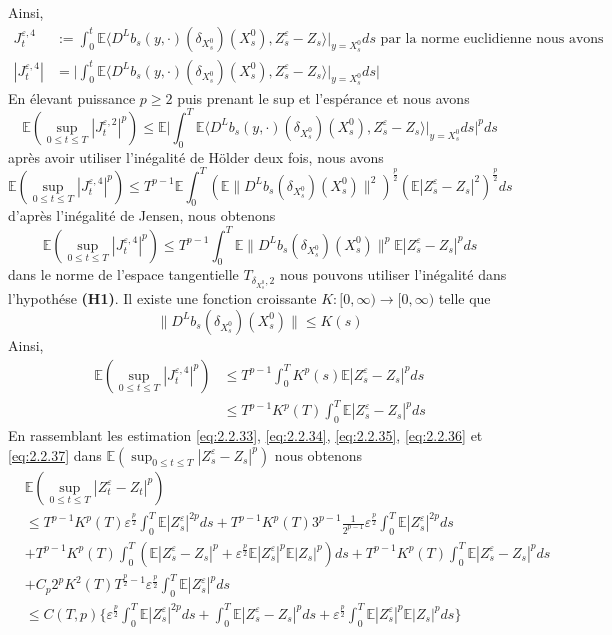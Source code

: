 \documentclass[12pt,a4paper,twoside,fleqn]{book}%
\theoremstyle{definition}
\theoremstyle{lemme}
\numberwithin{equation}{section}
\begin{document}
Ainsi,
\[\begin{aligned}
J_t^{\varepsilon,4}&:=\int_{0}^{t}\mathbb{E}\langle D^L b_s(y, \cdot)(\delta_{X_s^0})(X_s^0), Z_s^\varepsilon-Z_s\rangle|_{y=X_s^0}ds\text{ par la norme euclidienne nous avons}\\
|J_t^{\varepsilon,4}|&= \Big|\int_{0}^{t}\mathbb{E}\langle D^L b_s(y, \cdot)(\delta_{X_s^0})(X_s^0), Z_s^\varepsilon-Z_s\rangle|_{y=X_s^0}ds\Big|
\end{aligned}
\]
En élevant puissance $p\geq2$ puis prenant le sup et l'espérance et nous avons
\[
\mathbb{E}\left(\sup_{0\leq t \leq T}|J_t^{\varepsilon,2}|^p\right)\leq \mathbb{E}\Big|\int_{0}^{T}\mathbb{E}\langle D^L b_s(y, \cdot)(\delta_{X_s^0})(X_s^0), Z_s^\varepsilon-Z_s\rangle|_{y=X_s^0}ds\Big|^pds 
\]
après avoir utiliser l'inégalité de Hölder deux fois, nous avons
\[
\mathbb{E}\left(\sup_{0\leq t \leq T}|J_t^{\varepsilon,4}|^p\right)\leq T^{p-1}\mathbb{E}\int_{0}^{T}\left(\mathbb{E}\|D^Lb_s(\delta_{X_s^0})(X_s^0)\|^2\right)^{\frac{p}{2}}\left(\mathbb{E}|Z_s^\varepsilon-Z_s|^2\right)^{\frac{p}{2}}ds
\]
d'après l'inégalité de Jensen, nous obtenons
\[
\mathbb{E}\left(\sup_{0\leq t \leq T}|J_t^{\varepsilon,4}|^p\right)\leq T^{p-1}\int_{0}^{T}\mathbb{E}\|D^Lb_s(\delta_{X_s^0})(X_s^0)\|^p\mathbb{E}|Z_s^\varepsilon-Z_s|^p ds
\]
dans le norme de l'espace tangentielle $T_{\delta_{X_s^0},2}$ nous pouvons utiliser l'inégalité dans l'hypothése \textbf{(H1)}. Il existe une fonction croissante $K:[0,\infty)\to[0,\infty)$ telle que 
\[
\|D^Lb_s(\delta_{X_s^0})(X_s^0)\|\leq K(s)
\]
Ainsi,
\begin{equation}\label{eq:2.2.37}
	\begin{aligned}
\mathbb{E}\left(\sup_{0\leq t \leq T}|J_t^{\varepsilon,4}|^p\right)&\leq T^{p-1}\int_{0}^{T} K^p(s)\mathbb{E}|Z_s^\varepsilon-Z_s|^p ds\\
&\leq T^{p-1}K^p(T)\int_{0}^{T}\mathbb{E}|Z_s^\varepsilon-Z_s|^p ds
\end{aligned}
\end{equation}
 En rassemblant les estimation  \ref{eq:2.2.33}, \ref{eq:2.2.34}, \ref{eq:2.2.35},  \ref{eq:2.2.36} et \ref{eq:2.2.37} dans $\mathbb{E}\left(\sup_{0\leq t \leq T}|Z_s^\varepsilon-Z_s|^p\right)$ nous obtenons
\[\begin{aligned}
&\mathbb{E}\left(\sup_{0\leq t \leq T}|Z_t^\varepsilon - Z_t|^p \right)\\
&\leq T^{p-1}K^p(T)\varepsilon^{\frac{p}{2}}\int_{0}^{T}\mathbb{E}|Z^\varepsilon_s|^{2p}ds
+ T^{p-1}K^p(T)3^{p-1}\frac{1}{2^{p-1}}\varepsilon^{\frac{p}{2}} \int_{0}^{T} \mathbb{E}|Z_s^\varepsilon|^{2p}ds\\
&+ T^{p-1}K^p(T)\int_{0}^{T}\left(\mathbb{E}|Z_s^\varepsilon-Z_s|^p+ \varepsilon^{\frac{p}{2}}\mathbb{E}|Z_s^\varepsilon|^p\mathbb{E}|Z_s|^{p}\right)ds+T^{p-1}K^p(T)\int_{0}^{T} \mathbb{E}|Z_s^\varepsilon-Z_s|^p ds\\
&+ C_p2^pK^2(T)T^{\frac{p}{2}-1}\varepsilon^{\frac{p}{2}}\int_{0}^{T}\mathbb{E}|Z_s^\varepsilon|^pds\\
&\leq C(T,p)\Big\{ \varepsilon^{\frac{p}{2}}\int_{0}^{T}\mathbb{E}|Z_s^\varepsilon|^{2p}ds + \int_{0}^{T}\mathbb{E}|Z_s^\varepsilon-Z_s|^p ds +\varepsilon^{\frac{p}{2}}\int_{0}^{T} \mathbb{E}|Z_s^\varepsilon|^p\mathbb{E}|Z_s|^p ds\Big\}
\end{aligned}
\]
\end{document}

